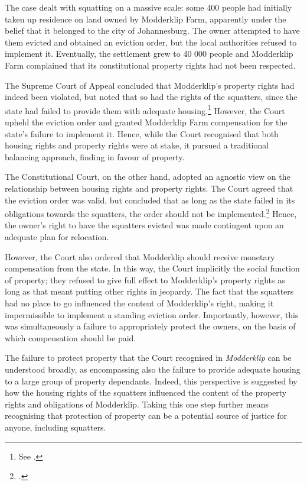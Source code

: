 The case dealt with squatting on a massive scale: some 400 people had initially taken up residence on land owned by Modderklip Farm, apparently under the belief that it belonged to the city of Johannesburg. The owner attempted to have them evicted and obtained an eviction order, but the local authorities refused to implement it. Eventually, the settlement grew to 40 000 people and Modderklip Farm complained that its constitutional property rights had not been respected.

The Supreme Court of Appeal concluded that Modderklip's property rights had indeed been violated, but noted that so had the rights of the squatters, since the state had failed to provide them with adequate housing.\footnote{See \cite{modderklip04}.} However, the Court upheld the eviction order and granted Modderklip Farm compensation for the state's failure to implement it. Hence, while the Court recognised that both housing rights and property rights were at stake, it pursued a traditional balancing approach, finding in favour of property.

The Constitutional Court, on the other hand, adopted an agnostic view on the relationship between housing rights and property rights. The Court agreed that the eviction order was valid, but concluded that as long as the state failed in its obligations towards the squatters, the order should not be implemented.\footcite{modderklip05} Hence, the owner's right to have the squatters evicted was made contingent upon an adequate plan for relocation. 

However, the Court also ordered that Modderklip should receive monetary compensation from the state. In this way, the Court implicitly  the social function of property; they refused to give full effect to Modderklip's property rights as long as that meant putting other rights in jeopardy. The fact that the squatters had no place to go influenced the content of Modderklip's right, making it impermissible to implement a standing eviction order. Importantly, however, this was simultaneously a failure to appropriately protect the owners, on the basis of which compensation should be paid.

The failure to protect property that the Court recognised in {\it Modderklip} can be understood broadly, as encompassing also the failure to provide adequate housing to a large group of property dependants. Indeed, this perspective is suggested by how the housing rights of the squatters influenced the content of the property rights and obligations of Modderklip. Taking this one step further means recognising that protection of property can be a potential source of justice for anyone, including squatters.

